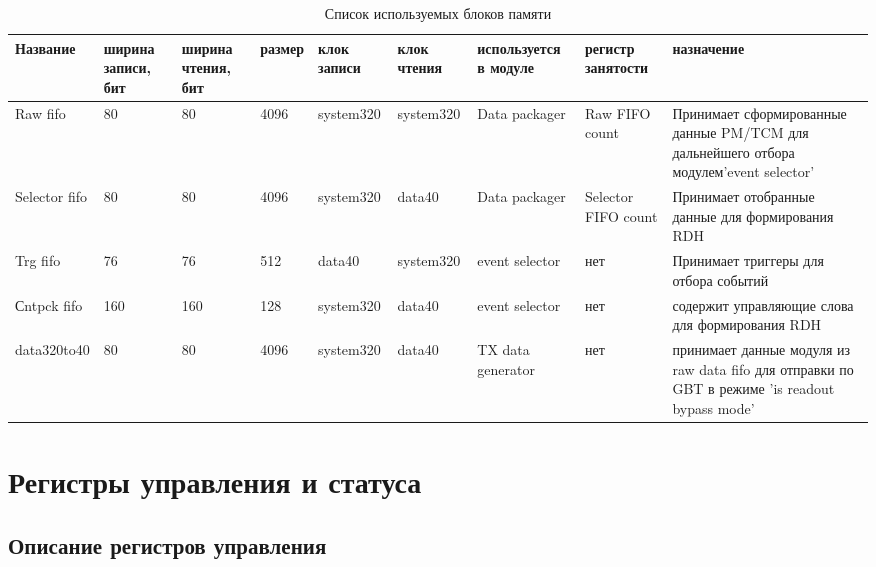 \documentclass{article}
\begin{document}
\begin{table}[H]
\begin{tabularx}{1\textwidth}{|p{}|p{1cm}|p{1cm}|p{1cm}|p{}|p{}|p{}|p{}|X|}
\hline
Название & ширина записи, бит & ширина чтения, бит & размер & клок записи & клок чтения & используется в модуле & регистр занятости & назначение \\ \hline

Raw fifo & 80 & 80 & 4096 & system320 & system320 & Data packager & Raw FIFO count & Принимает сформированные данные PM/TCM для дальнейшего отбора модулем'event selector' \\ \hline

Selector fifo & 80 & 80 & 4096 & system320 & data40 & Data packager & Selector FIFO count & Принимает отобранные данные для формирования RDH \\ \hline

Trg fifo & 76 & 76 & 512 & data40 & system320 & event selector & нет & Принимает триггеры для отбора событий \\ \hline

Сntpck fifo & 160 & 160 & 128 & system320 & data40 & event selector & нет & содержит управляющие слова для формирования RDH \\ \hline

data320to40 & 80 & 80 & 4096 & system320 & data40 & TX data generator & нет & принимает данные модуля из raw data fifo для отправки по GBT в режиме 'is readout bypass mode' \\ \hline

\end{tabularx}
\caption{Список используемых блоков памяти\label{tab0}}
\end{table}





\section{Регистры управления и статуса}

\subsection{Описание регистров управления}
\end{document}
